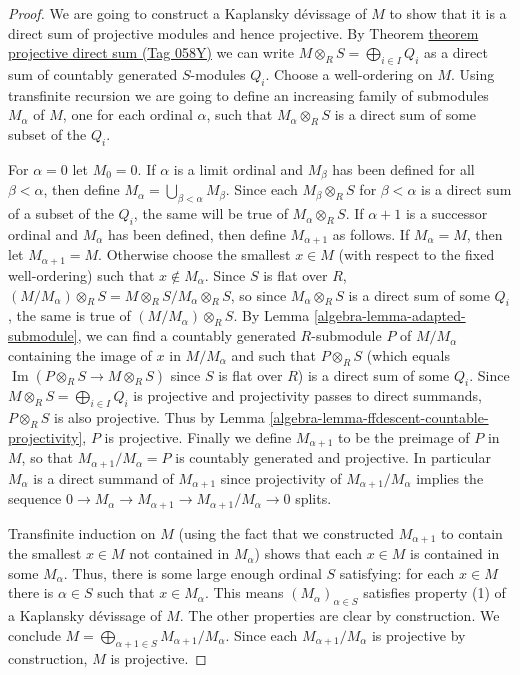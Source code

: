 \documentclass{amsart}
\theoremstyle{plain}
\theoremstyle{definition}
\theoremstyle{remark}
\numberwithin{equation}{subsection}
\def\Im{\mathop{\mathrm{Im}}}
\begin{document}
\begin{proof}
We are going to construct a Kaplansky d\'evissage of $M$ to show that it is a
direct sum of projective modules and hence projective.  By Theorem
\href{https://stacks.math.columbia.edu/tag/058Y}{theorem projective direct sum (Tag 058Y)} we can write $M \otimes_R S =
\bigoplus_{i \in I} Q_i$ as a direct sum of countably generated $S$-modules
$Q_i$.  Choose a well-ordering on $M$.  Using transfinite recursion we are going
to define an increasing family of submodules $M_{\alpha}$ of $M$, one for each
ordinal $\alpha$, such that $M_{\alpha} \otimes_R S$ is a direct sum of some
subset of the $Q_i$.

\medskip\noindent
For $\alpha = 0$ let $M_0 = 0$.  If $\alpha$ is a limit ordinal and $M_{\beta}$
has been defined for all $\beta < \alpha$, then define $M_\alpha =
\bigcup_{\beta < \alpha} M_{\beta}$.  Since each $M_{\beta} \otimes_R S$ for
$\beta < \alpha$ is a direct sum of a subset of the $Q_i$, the same will be
true of $M_{\alpha} \otimes_R S$.  If $\alpha + 1$ is a successor ordinal and
$M_{\alpha}$ has been defined, then define $M_{\alpha + 1}$ as follows.  If
$M_{\alpha} = M$, then let $M_{\alpha +1} = M$.  Otherwise choose the smallest
$x \in M$ (with respect to the fixed well-ordering) such that $x \notin
M_{\alpha}$. Since $S$ is flat over $R$, $(M/M_{\alpha}) \otimes_R S = M
\otimes_R S/M_{\alpha} \otimes_R S$, so since $M_{\alpha} \otimes_R S$ is
a direct sum of some $Q_i$, the same is true of $(M/M_{\alpha}) \otimes_R
S$.   By Lemma \ref{algebra-lemma-adapted-submodule}, we can find a countably generated
$R$-submodule $P$ of $M/M_{\alpha}$ containing the image of $x$ in
$M/M_{\alpha}$ and such that $P \otimes_R S$ (which equals $\Im(P
\otimes_R S \to M \otimes_R S)$ since $S$ is flat over $R$) is a
direct sum of some $Q_i$. Since $M \otimes_R S = \bigoplus_{i \in I} Q_i$
is projective and projectivity passes to direct summands, $P \otimes_R S$ is
also projective.  Thus by Lemma \ref{algebra-lemma-ffdescent-countable-projectivity},
$P$ is projective.  Finally we define $M_{\alpha + 1}$ to be the preimage of $P$
in $M$, so that $M_{\alpha + 1}/M_{\alpha} = P$ is countably generated and
projective.  In particular $M_{\alpha}$ is a direct summand of $M_{\alpha + 1}$
since projectivity of $M_{\alpha + 1}/M_{\alpha}$ implies the sequence $0
\to M_{\alpha} \to M_{\alpha + 1} \to
M_{\alpha + 1}/M_{\alpha} \to 0$ splits.

\medskip\noindent
Transfinite induction on $M$ (using the fact that we constructed
$M_{\alpha + 1}$ to contain the smallest $x \in M$ not contained in
$M_{\alpha}$) shows that
each $x \in M$ is contained in some $M_{\alpha}$.  Thus, there is some large
enough ordinal $S$ satisfying: for each $x \in M$ there is $\alpha \in S$ such
that $x \in M_{\alpha}$.  This means $(M_{\alpha})_{\alpha \in S}$ satisfies
property (1) of a Kaplansky d\'evissage of $M$.  The other properties are clear
by construction.  We conclude
$M = \bigoplus_{\alpha + 1 \in S} M_{\alpha + 1}/M_{\alpha}$.
Since each $M_{\alpha + 1}/M_{\alpha}$ is projective
by construction, $M$ is projective.
\end{proof}
\end{document}
